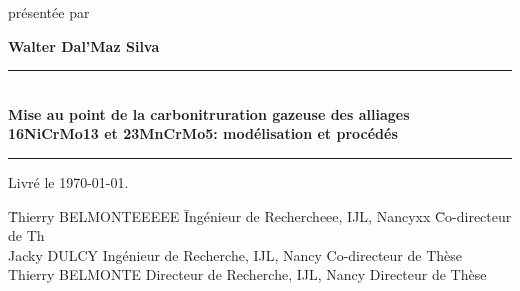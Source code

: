 \begin{titlepage}
\begin{center}
\begin{minipage}{0.9\textwidth}
\begin{center}
    		{\normalsize présentée par}\\
    		\vspace{6mm}
    		
    		{\bfseries\large Walter Dal'Maz Silva}\\
    		\vspace{6mm}
  		
        {\rule{\textwidth}{2pt}\\
          \centering\Large\bfseries
          Mise au point de la carbonitruration gazeuse des alliages\\
          16NiCrMo13 et 23MnCrMo5: modélisation et procédés\\
          \rule{\textwidth}{2pt}
        }   
    	\end{center}
    		
    	\begin{flushleft}
    		\vspace{3mm} 
    		{\large Livré le {\today}.}
    	\end{flushleft}
    		
    	\vspace{2cm}
		
    	\begin{center}
    		\begin{tabbing}
    				\= Thierry BELMONTEEEEE
    				\= Ingénieur de Rechercheee, IJL, Nancyxx
    				\= Co-directeur de Th\kill\\
    				\>Jacky DULCY \>Ingénieur de Recherche, IJL, Nancy
    				\>Co-directeur de Thèse\\[5pt]
    				\>Thierry BELMONTE \>Directeur de Recherche, IJL, Nancy
    				\>Directeur de Thèse\\[5pt]
    		\end{tabbing}
    	\end{center}
    	\vfill
  	\end{minipage}
  \end{center}  	
\end{titlepage}
\newpage\thispagestyle{empty}\cleardoublepage
\endinput

%		
%		
